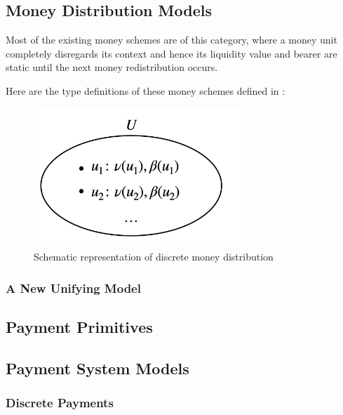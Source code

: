 \documentclass[a4paper]{report}
\begin{document}
\subsection{Money Distribution Models}

Most of the existing money schemes are of this category, where a money unit completely disregards its context and hence
its liquidity value and bearer are static until the next money redistribution occurs.

Here are the type definitions of these money schemes defined in \cite{buldas2021unifying}:

\begin{figure}
  \includegraphics[width=\linewidth]{assets/discrete-money-distribution.png}
  \caption{Schematic representation of discrete money distribution}
  \label{fig:discrete-md}
\end{figure}

\subsubsection{A New Unifying Model}



\subsection{Payment Primitives}

\subsection{Payment System Models}

\subsubsection{Discrete Payments}
\end{document}
